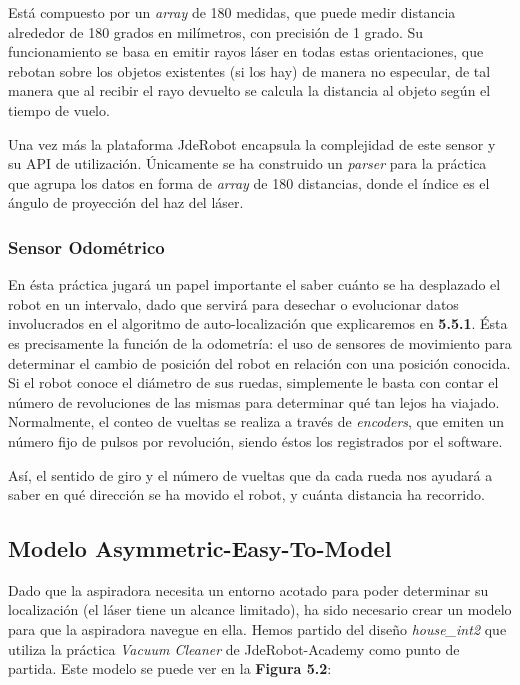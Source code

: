 Está compuesto por un \textit{array} de 180 medidas, que puede medir distancia alrededor de 180 grados en milímetros, con precisión de 1 grado. Su funcionamiento se basa en emitir rayos láser en todas estas orientaciones, que rebotan sobre los objetos existentes (si los hay) de manera no especular, de tal manera que al recibir el rayo devuelto se calcula la distancia al objeto según el tiempo de vuelo.

Una vez más la plataforma JdeRobot encapsula la complejidad de este sensor y su API de utilización. Únicamente se ha construido un \textit{parser} para la práctica que agrupa los datos en forma de \textit{array} de 180 distancias, donde el índice es el ángulo de proyección del haz del láser.
 
\subsubsection{Sensor Odométrico}
En ésta práctica jugará un papel importante el saber cuánto se ha desplazado el robot en un intervalo, dado que servirá para desechar o evolucionar datos involucrados en el algoritmo de auto-localización que explicaremos en \textbf{5.5.1}. Ésta es precisamente la función de la odometría: el uso de sensores de movimiento para determinar el cambio de posición del robot en relación con una posición conocida. Si el robot conoce el diámetro de sus ruedas, simplemente le basta con contar el número de revoluciones de las mismas para determinar qué tan lejos ha viajado. Normalmente, el conteo de vueltas se realiza a través de \textit{encoders}, que emiten un número fijo de pulsos por revolución, siendo éstos los registrados por el software.

Así, el sentido de giro y el número de vueltas que da cada rueda nos ayudará a saber en qué dirección se ha movido el robot, y cuánta distancia ha recorrido.

\subsection{Modelo Asymmetric-Easy-To-Model} 
Dado que la aspiradora necesita un entorno acotado para poder determinar su localización (el láser tiene un alcance limitado), ha sido necesario crear un modelo para que la aspiradora navegue en ella.
Hemos partido del diseño \textit{house\_int2} que utiliza la práctica \textit{Vacuum Cleaner} de JdeRobot-Academy como punto de partida. Este modelo se puede ver en la \textbf{Figura 5.2}:

